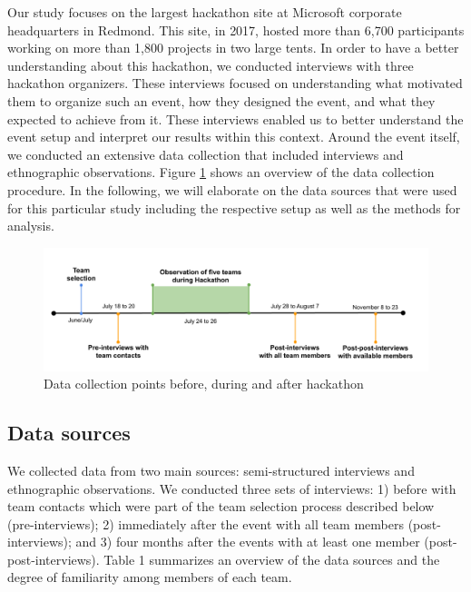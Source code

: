 \documentclass{hcij}
\begin{document}
Our study focuses on the largest hackathon site at Microsoft corporate headquarters in Redmond. This site, in 2017, hosted more than 6,700 participants working on more than 1,800 projects in two large tents. In order to have a better understanding about this hackathon, we conducted interviews with three hackathon organizers. These interviews focused on understanding what motivated them to organize such an event, how they designed the event, and what they expected to achieve from it. These interviews enabled us to better understand the event setup and interpret our results within this context. Around the event itself, we conducted an extensive data collection that included interviews and ethnographic observations. Figure \ref{fig:timeline} shows an overview of the data collection procedure. In the following, we will elaborate on the data sources that were used for this particular study including the respective setup as well as the methods for analysis.

\begin{figure}[H]
\centering
\includegraphics[width=6in]{hackathon-timeline.png}
\caption{Data collection points before, during and after hackathon}
\label{fig:timeline}
\end{figure}


\subsection{Data sources}
We collected data from two main sources: semi-structured interviews and ethnographic observations. We conducted three sets of interviews: 1) before with team contacts which were part of the team selection process described below (pre-interviews); 2) immediately after the event with all team members (post-interviews); and 3) four months after the events with at least one member (post-post-interviews). Table 1 summarizes an overview of the data sources and the degree of familiarity among members of each team.
\end{document}
